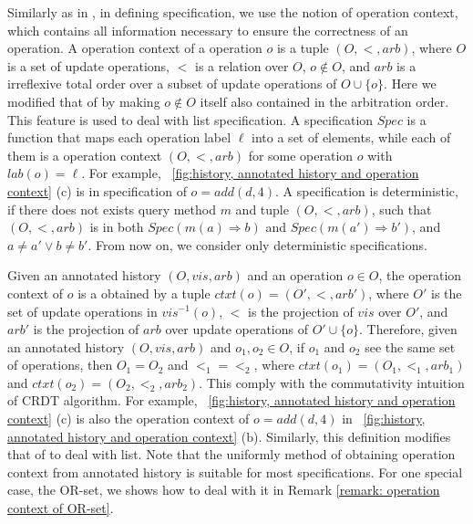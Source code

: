 {\color {red}Similarly as in \cite{Burckhardt:2014}, in defining specification, we use the notion of operation context, which contains all information necessary to ensure the correctness of an operation.} A operation context of a operation $o$ is a tuple $(O,<,\mathit{arb})$, where $O$ is a set of update operations, $<$ is a relation over $O$, $o \notin O$, and $\mathit{arb}$ is a irreflexive total order over a subset of update operations of $O \cup \{ o \}$. {\color {red}Here we modified that of \cite{Burckhardt:2014} by making $o \notin O$ itself also contained in the arbitration order. This feature is used to deal with list specification.} A specification $\mathit{Spec}$ is a function that maps each operation label $\ell$ into a set of elements, while each of them is a operation context $(O,<,\mathit{arb})$ for some operation $o$ with $\mathit{lab}(o) = \ell$. {\color {red} For example, \figurename~\ref{fig:history, annotated history and operation context} (c) is in specification of $o = \mathit{add}(d,4)$.} A specification is deterministic, if there does not exists query method $m$ and tuple $(O,<,\mathit{arb})$, such that $(O,<,\mathit{arb})$ is in both $\mathit{Spec}(m(a) \Rightarrow b)$ and $\mathit{Spec}(m(a') \Rightarrow b')$, and $a \neq a' \vee b \neq b'$. From now on, we consider only deterministic specifications.

Given an annotated history $(O,\mathit{vis},\mathit{arb})$ and an operation $o \in O$, the operation context of $o$ is a obtained by a tuple $ctxt(o)=(O',<,\mathit{arb}')$, where $O'$ is the set of update operations in $\mathit{vis}^{-1}(o)$, $<$ is the projection of $\mathit{vis}$ over $O'$, and $\mathit{arb}'$ is the projection of $\mathit{arb}$ over update operations of $O' \cup \{ o \}$. Therefore, given an annotated history $(O,\mathit{vis},\mathit{arb})$ and $o_1,o_2 \in O$, if $o_1$ and $o_2$ see the same set of operations, %
then $O_1 = O_2$ and $<_1 = <_2$, where $ctxt(o_1)=(O_1,<_1,\mathit{arb}_1)$ and $ctxt(o_2)=(O_2,<_2,\mathit{arb}_2)$. This comply with the commutativity intuition of CRDT algorithm. {\color {red} For example, \figurename~\ref{fig:history, annotated history and operation context} (c) is also the operation context of $o = \mathit{add}(d,4)$ in \figurename~\ref{fig:history, annotated history and operation context} (b).} {\color {red}Similarly, this definition modifies that of \cite{Burckhardt:2014} to deal with list.} Note that the uniformly method of obtaining operation context from annotated history is suitable for most specifications. For one special case, the OR-set, we shows how to deal with it in Remark \ref{remark: operation context of OR-set}.

